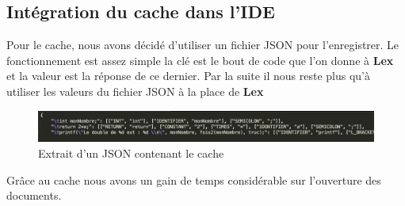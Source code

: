 \documentclass[a4paper,12pt]{article}
\begin{document}
	\subsection{Intégration du cache dans l'IDE}

		Pour le cache, nous avons décidé d'utiliser un fichier JSON pour l'enregistrer. Le fonctionnement est assez simple la clé est le bout de code que l'on donne à \textbf{Lex} et la valeur est la réponse de ce dernier. Par la suite il nous reste plus qu'à utiliser les valeurs du fichier JSON à la place de \textbf{Lex}

			\begin{figure}[h!]
				\begin{center}
					\includegraphics[scale=0.5]{imgs/exempleJsonCache}
					\caption{Extrait d'un JSON contenant le cache}
				\end{center}
			\end{figure}

		Grâce au cache nous avons un gain de temps considérable sur l'ouverture des documents.
	
\end{document}

